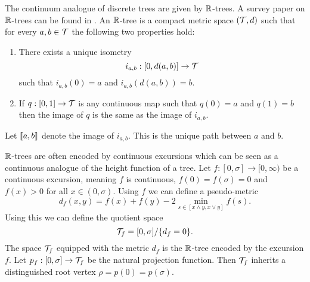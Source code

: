 The continuum analogue of discrete trees are given by ${\mathbb R}$-trees. A survey paper on ${\mathbb R}$-trees can be found in \cite{legallRandomTreesApplications2005}. An ${\mathbb R}$-tree is a compact metric space $({\mathcal T}, d)$ such that for every $a, b \in {\mathcal T}$ the following two properties hold:
\begin{enumerate}
    \item There exists a unique isometry $$i_{a, b} : [0, d(a, b)] \to {\mathcal T}$$ such that $i_{a, b}(0) = a$ and $i_{a, b}(d(a, b)) = b$.
    \item If $q: [0, 1] \to {\mathcal T}$ is any continuous map such that $q(0) = a$ and $q(1) = b$ then the image of $q$ is the same as the image of $i_{a, b}$.
\end{enumerate}
Let $\llbracket a, b\rrbracket$ denote the image of $i_{a, b}$. This is the unique path between $a$ and $b$.

${\mathbb R}$-trees are often encoded by continuous excursions which can be seen as a continuous analogue of the height function of a tree. Let $f: [0, \sigma] \to [0, \infty)$ be a continuous excursion, meaning $f$ is continuous, $f(0) = f(\sigma) = 0$ and $f(x) > 0$ for all $x \in (0, \sigma)$. Using $f$ we can define a pseudo-metric
\begin{equation*}
    d_f(x, y) = f(x) + f(y) - 2 \min_{s \in [x \wedge y, x \vee y]} f(s).
\end{equation*}
Using this we can define the quotient space
\begin{equation*}
    {\mathcal T}_f = [0, \sigma] / \{d_f = 0\}.
\end{equation*}
The space ${\mathcal T}_f$ equipped with the metric $d_f$ is the ${\mathbb R}$-tree encoded by the excursion $f$. Let $p_f: [0, \sigma] \to {\mathcal T}_f$ be the natural projection function. Then ${\mathcal T}_f$ inherits a distinguished root vertex $\rho = p(0) = p(\sigma)$.